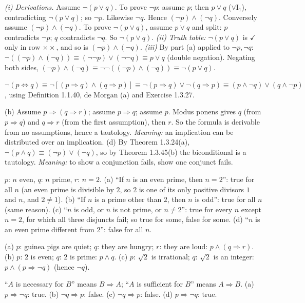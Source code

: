  \emph{(i) Derivations.} Assume $\neg(p\vee q)$. To prove $\neg p$: assume $p$; then $p\vee q$ ($\vee$I$_1$), contradicting $\neg(p\vee q)$; so $\neg p$. Likewise $\neg q$. Hence $(\neg p)\wedge(\neg q)$. Conversely assume $(\neg p)\wedge(\neg q)$. To prove $\neg(p\vee q)$, assume $p\vee q$ and split: $p$ contradicts $\neg p$; $q$ contradicts $\neg q$. So $\neg(p\vee q)$. \emph{(ii) Truth table:} $\neg(p\vee q)$ is $\checkmark$ only in row $\times\times$, and so is $(\neg p)\wedge(\neg q)$. \emph{(iii)} By part (a) applied to $\neg p,\neg q$: $\neg((\neg p)\wedge(\neg q))\equiv(\neg\neg p)\vee(\neg\neg q)\equiv p\vee q$ (double negation). Negating both sides, $(\neg p)\wedge(\neg q)\equiv\neg\neg((\neg p)\wedge(\neg q))\equiv\neg(p\vee q)$.

 $\neg(p\Leftrightarrow q)\equiv\neg[(p\Rightarrow q)\wedge(q\Rightarrow p)]\equiv\neg(p\Rightarrow q)\vee\neg(q\Rightarrow p)\equiv(p\wedge\neg q)\vee(q\wedge\neg p)$, using Definition 1.1.40, de Morgan (a) and Exercise 1.3.27.

 (b) Assume $p\Rightarrow(q\Rightarrow r)$; assume $p\Rightarrow q$; assume $p$. Modus ponens gives $q$ (from $p\Rightarrow q$) and $q\Rightarrow r$ (from the first assumption), then $r$. So the formula is derivable from no assumptions, hence a tautology. \emph{Meaning:} an implication can be distributed over an implication. (d) By Theorem 1.3.24(a), $\neg(p\wedge q)\equiv(\neg p)\vee(\neg q)$, so by Theorem 1.3.45(b) the biconditional is a tautology. \emph{Meaning:} to show a conjunction fails, show one conjunct fails.

 $p$: $n$ even, $q$: $n$ prime, $r$: $n=2$. (a) ``If $n$ is an even prime, then $n=2$'': true for all $n$ (an even prime is divisible by $2$, so $2$ is one of its only positive divisors $1$ and $n$, and $2\ne1$). (b) ``If $n$ is a prime other than $2$, then $n$ is odd'': true for all $n$ (same reason). (c) ``$n$ is odd, or $n$ is not prime, or $n\ne2$'': true for every $n$ except $n=2$, for which all three disjuncts fail; so true for some, false for some. (d) ``$n$ is an even prime different from $2$'': false for all $n$.

 (a) $p$: guinea pigs are quiet; $q$: they are hungry; $r$: they are loud: $p\wedge(q\Rightarrow r)$. (b) $p$: $2$ is even; $q$: $2$ is prime: $p\wedge q$. (c) $p$: $\sqrt2$ is irrational; $q$: $\sqrt2$ is an integer: $p\wedge(p\Rightarrow\neg q)$ (hence $\neg q$).

 ``$A$ is necessary for $B$'' means $B\Rightarrow A$; ``$A$ is sufficient for $B$'' means $A\Rightarrow B$. (a) $p\Rightarrow\neg q$: true. (b) $\neg q\Rightarrow p$: false. (c) $\neg q\Rightarrow p$: false. (d) $p\Rightarrow\neg q$: true.

